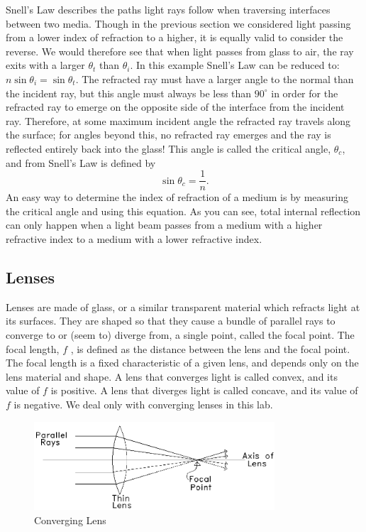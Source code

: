 Snell's Law describes the paths light rays follow when traversing interfaces between two media.  Though in the previous section we considered light passing from a lower index of refraction to a higher, it is equally valid to consider the reverse. We would therefore see that when light passes from glass to air, the ray exits with a larger $\theta_{t}$ than $\theta_{i}$.  In this example Snell's Law can be reduced to: $n \sin \theta_{i} = \sin \theta_{t}$.  The refracted ray must have a larger angle to the normal than the incident ray, but this angle must always be less than $90^\circ$ in order for the refracted ray to emerge on the opposite side of the interface from the incident ray.  Therefore, at some maximum incident angle the refracted ray travels along the surface; for angles beyond this, no refracted ray emerges and the ray is reflected entirely back into the glass! This angle is called the critical angle, $\theta_c$, and from Snell's Law is defined by
\begin{equation}
    \sin\theta_c = \frac{1}{n}.
\end{equation}
An easy way to determine the index of refraction of a medium is by measuring the critical angle and using this equation. As you can see, total internal reflection can only happen when a light beam passes from a medium with a higher refractive index to a medium with a lower refractive index.

\subsection{Lenses}
\label{sec:lenses}
Lenses are made of glass, or a similar transparent material which refracts light at its surfaces. They are shaped so that they cause a bundle of parallel rays to converge to or (seem to) diverge from, a single point, called the focal point. The focal length, $f$ , is defined as the distance between the lens and the focal point. The focal length is a fixed characteristic of a given lens, and depends only on the lens material and shape. A lens that converges light is called convex, and its value of $f$ is positive. A lens that diverges light is called concave, and its value of $f$ is negative. We deal only with converging lenses in this lab.
\begin{figure}[h]
\centering
\includegraphics[width=0.8\textwidth]{./Exp6/pic/image1.png}
\caption{Converging Lens}
\end{figure}

